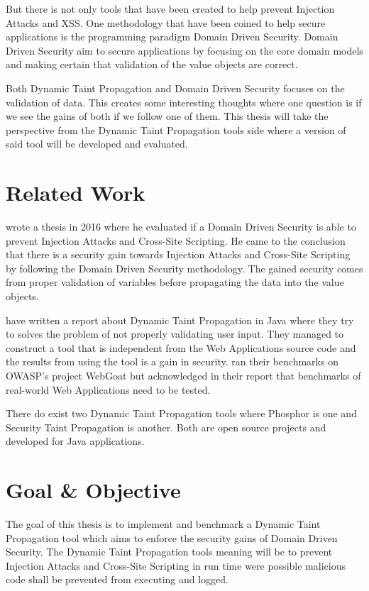 \documentclass{../kththesis}
\begin{document}
But there is not only tools that have been created to help prevent Injection Attacks and XSS. One methodology that have been coined to help secure applications is the programming paradigm Domain Driven Security. Domain Driven Security aim to secure applications by focusing on the core domain models and making certain that validation of the value objects are correct. \parencite{Wilander2009, Johnsson2009} 

Both Dynamic Taint Propagation and Domain Driven Security focuses on the validation of data. This creates some interesting thoughts where one question is if we see the gains of both if we follow one of them. This thesis will take the perspective from the Dynamic Taint Propagation tools side where a version of said tool will be developed and evaluated. 



\section{Related Work}
\textcite{Stendahl2016} wrote a thesis in 2016 where he evaluated if a Domain Driven Security is able to prevent Injection Attacks and Cross-Site Scripting. He came to the conclusion that there is a security gain towards Injection Attacks and Cross-Site Scripting by following the Domain Driven Security methodology. The gained security comes from proper validation of variables before propagating the data into the value objects.

\textcite{Haldar} have written a report about Dynamic Taint Propagation in Java where they try to solves the problem of not properly validating user input. They managed to construct a tool that is independent from the Web Applications source code and the results from using the tool is a gain in security. \textcite{Haldar} ran their benchmarks on OWASP's project WebGoat \parencite{webgoat} but acknowledged in their report that benchmarks of real-world Web Applications need to be tested.

There do exist two Dynamic Taint Propagation tools where Phosphor \parencite{phosphor} is one and Security Taint Propagation \parencite{securityTaint} is another. Both are open source projects and developed for Java applications.


\section{Goal \& Objective}
The goal of this thesis is to implement and benchmark a Dynamic Taint Propagation tool which aims to enforce the security gains of Domain Driven Security. The Dynamic Taint Propagation tools meaning will be to prevent Injection Attacks and Cross-Site Scripting in run time were possible malicious code shall be prevented from executing and logged.
\end{document}

